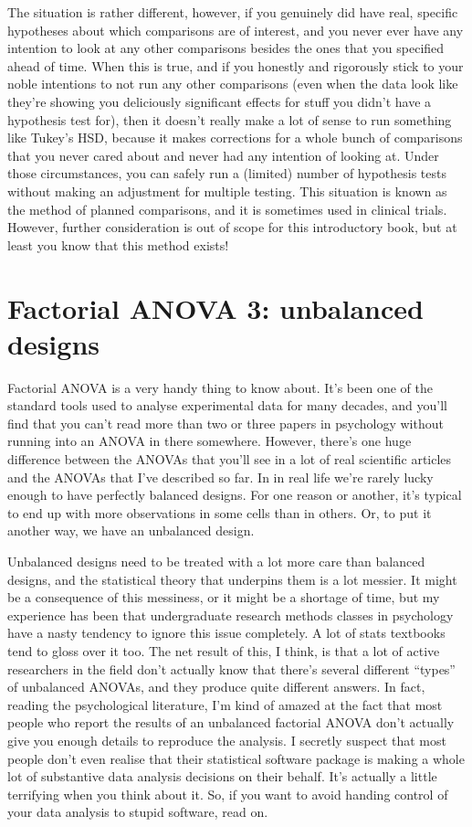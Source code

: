 \documentclass[
  a4paper,
]{book}
\begin{document}
The situation is rather different, however, if you genuinely did have
real, specific hypotheses about which comparisons are of interest, and
you never ever have any intention to look at any other comparisons
besides the ones that you specified ahead of time. When this is true,
and if you honestly and rigorously stick to your noble intentions to not
run any other comparisons (even when the data look like they're showing
you deliciously significant effects for stuff you didn't have a
hypothesis test for), then it doesn't really make a lot of sense to run
something like Tukey's HSD, because it makes corrections for a whole
bunch of comparisons that you never cared about and never had any
intention of looking at. Under those circumstances, you can safely run a
(limited) number of hypothesis tests without making an adjustment for
multiple testing. This situation is known as the method of planned
comparisons, and it is sometimes used in clinical trials. However,
further consideration is out of scope for this introductory book, but at
least you know that this method exists!

\hypertarget{factorial-anova-3-unbalanced-designs}{%
\section{Factorial ANOVA 3: unbalanced
designs}\label{factorial-anova-3-unbalanced-designs}}

Factorial ANOVA is a very handy thing to know about. It's been one of
the standard tools used to analyse experimental data for many decades,
and you'll find that you can't read more than two or three papers in
psychology without running into an ANOVA in there somewhere. However,
there's one huge difference between the ANOVAs that you'll see in a lot
of real scientific articles and the ANOVAs that I've described so far.
In in real life we're rarely lucky enough to have perfectly balanced
designs. For one reason or another, it's typical to end up with more
observations in some cells than in others. Or, to put it another way, we
have an unbalanced design.

Unbalanced designs need to be treated with a lot more care than balanced
designs, and the statistical theory that underpins them is a lot
messier. It might be a consequence of this messiness, or it might be a
shortage of time, but my experience has been that undergraduate research
methods classes in psychology have a nasty tendency to ignore this issue
completely. A lot of stats textbooks tend to gloss over it too. The net
result of this, I think, is that a lot of active researchers in the
field don't actually know that there's several different ``types'' of
unbalanced ANOVAs, and they produce quite different answers. In fact,
reading the psychological literature, I'm kind of amazed at the fact
that most people who report the results of an unbalanced factorial ANOVA
don't actually give you enough details to reproduce the analysis. I
secretly suspect that most people don't even realise that their
statistical software package is making a whole lot of substantive data
analysis decisions on their behalf. It's actually a little terrifying
when you think about it. So, if you want to avoid handing control of
your data analysis to stupid software, read on.
\end{document}
